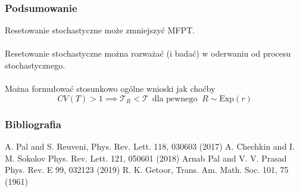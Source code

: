 \documentclass{beamer}
\newcommand{\1}{\mathbb{1}}
\newcommand{\T}{\mathcal{T}}
\begin{document}
\begin{frame}
\frametitle{Podsumowanie}
Resetowanie stochastyczne może zmniejszyć MFPT.\\~\\
\pause
Resetowanie stochastyczne można rozważać (i badać) w oderwaniu od procesu stochastycznego.\\~\\
\pause
Można formułować stosunkowo ogólne wnioski jak choćby
\begin{equation*}
\boxed{ CV(T) > 1 \implies \T_R < \T ~~\text{dla pewnego }~R \sim \text{Exp}(r)  }
\end{equation*}


\end{frame}


\begin{frame}
\frametitle{Bibliografia}
\begin{thebibliography}{7}
A. Pal and S. Reuveni, Phys. Rev. Lett. 118, 030603 (2017)
A. Chechkin and I. M. Sokolov Phys. Rev. Lett. 121, 050601 (2018)
Arnab Pal and V. V. Prasad Phys. Rev. E 99, 032123 (2019)
R. K. Getoor, Trans. Am. Math. Soc. 101, 75 (1961)
\end{thebibliography}
\end{frame}
\end{document}
